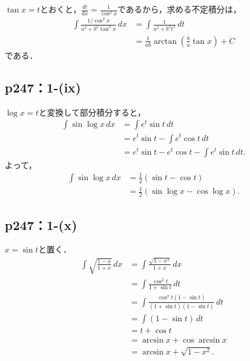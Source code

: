 \begin{tanswer}
    $\tan x = t$とおくと，$\frac{dt}{dx}= \frac{1}{\cos ^2 x}$であるから，求める不定積分は，
    \begin{align*}
        \int \frac{1/\cos ^2 x}{a^2 + b^2 \tan ^2 x} \, dx & = \int \frac{1}{a^2+b^2 t^2} \, dt                          \\
                                                           & = \frac{1}{ab} \arctan \left (\frac{b}{a} \tan x \right)+ C
    \end{align*}
    である．
\end{tanswer}



\subsection*{p247：1-(ix)}
\begin{tanswer}
    $\log x = t$と変換して部分積分すると，
    \begin{align*}
        \int \sin \log x \,dx
         & = \int e^t \sin t \,dt                            \\
         & = e^t \sin t - \int e^t \cos t \,dt               \\
         & = e^t \sin t - e^t \cos t - \int e^t \sin t \,dt.
    \end{align*}
    よって，
    \begin{align*}
        \int \sin \log x \,dx
         & = \frac{1}{2}(\sin t - \cos t)            \\
         & = \frac{1}{2}(\sin \log x - \cos \log x).
    \end{align*}
\end{tanswer}


\subsection*{p247：1-(x)}

\begin{tanswer}
    $x = \sin t$と置く．
    \begin{align*}
        \int \sqrt {\frac{1-x}{1+x}} \,dx
         & = \int \frac{\sqrt{1-x^2}}{1+x} \,dx                              \\
         & = \int \frac{\cos^2 t}{1 + \sin t} \,dt                           \\
         & = \int \frac{\cos^2 t(1 - \sin t)}{(1 + \sin t)(1 - \sin t)} \,dt \\
         & = \int (1 - \sin t) \,dt                                          \\
         & = t + \cos t                                                      \\
         & = \arcsin x  + \cos \arcsin x                                     \\
         & = \arcsin x + \sqrt{1-x^2}.
    \end{align*}
\end{tanswer}

